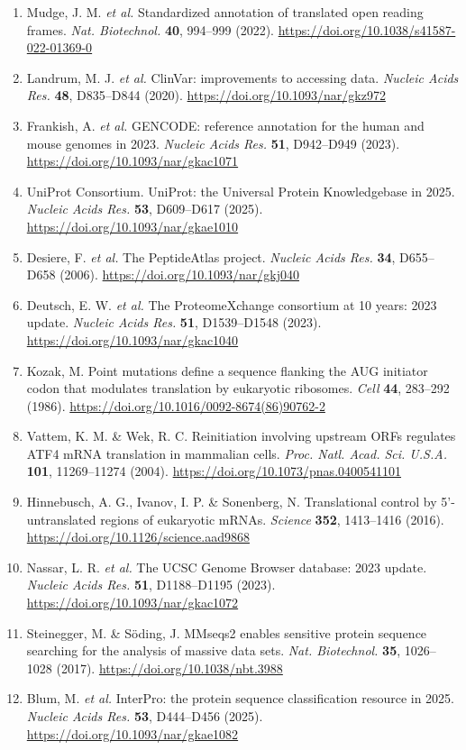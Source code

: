 \documentclass[10pt,letterpaper]{article}
\begin{document}
{\begin{enumerate}[leftmargin=1.9em,itemsep=-0.4pt,parsep=0pt,topsep=0.5pt]
  \item Mudge, J. M. \textit{et al.} Standardized annotation of translated open reading frames. \textit{Nat. Biotechnol.} \textbf{40}, 994--999 (2022). \url{https://doi.org/10.1038/s41587-022-01369-0}
  \item Landrum, M. J. \textit{et al.} ClinVar: improvements to accessing data. \textit{Nucleic Acids Res.} \textbf{48}, D835--D844 (2020). \url{https://doi.org/10.1093/nar/gkz972}
  \item Frankish, A. \textit{et al.} GENCODE: reference annotation for the human and mouse genomes in 2023. \textit{Nucleic Acids Res.} \textbf{51}, D942--D949 (2023). \url{https://doi.org/10.1093/nar/gkac1071}
  \item UniProt Consortium. UniProt: the Universal Protein Knowledgebase in 2025. \textit{Nucleic Acids Res.} \textbf{53}, D609--D617 (2025). \url{https://doi.org/10.1093/nar/gkae1010}
  \item Desiere, F. \textit{et al.} The PeptideAtlas project. \textit{Nucleic Acids Res.} \textbf{34}, D655--D658 (2006). \url{https://doi.org/10.1093/nar/gkj040}
  \item Deutsch, E. W. \textit{et al.} The ProteomeXchange consortium at 10 years: 2023 update. \textit{Nucleic Acids Res.} \textbf{51}, D1539--D1548 (2023). \url{https://doi.org/10.1093/nar/gkac1040}
  \item Kozak, M. Point mutations define a sequence flanking the AUG initiator codon that modulates translation by eukaryotic ribosomes. \textit{Cell} \textbf{44}, 283--292 (1986). \url{https://doi.org/10.1016/0092-8674(86)90762-2}
  \item Vattem, K. M. \& Wek, R. C. Reinitiation involving upstream ORFs regulates ATF4 mRNA translation in mammalian cells. \textit{Proc. Natl. Acad. Sci. U.S.A.} \textbf{101}, 11269--11274 (2004). \url{https://doi.org/10.1073/pnas.0400541101}
  \item Hinnebusch, A. G., Ivanov, I. P. \& Sonenberg, N. Translational control by 5'-untranslated regions of eukaryotic mRNAs. \textit{Science} \textbf{352}, 1413--1416 (2016). \url{https://doi.org/10.1126/science.aad9868}
  \item Nassar, L. R. \textit{et al.} The UCSC Genome Browser database: 2023 update. \textit{Nucleic Acids Res.} \textbf{51}, D1188--D1195 (2023). \url{https://doi.org/10.1093/nar/gkac1072}
  \item Steinegger, M. \& S\"oding, J. MMseqs2 enables sensitive protein sequence searching for the analysis of massive data sets. \textit{Nat. Biotechnol.} \textbf{35}, 1026--1028 (2017). \url{https://doi.org/10.1038/nbt.3988}
  \item Blum, M. \textit{et al.} InterPro: the protein sequence classification resource in 2025. \textit{Nucleic Acids Res.} \textbf{53}, D444--D456 (2025). \url{https://doi.org/10.1093/nar/gkae1082}
\end{enumerate}
}
\end{document}
